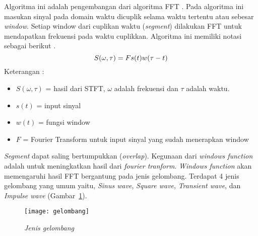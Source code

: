 Algoritma ini adalah pengembangan dari algoritma FFT \cite{yani:0:stft}. Pada algoritma ini masukan sinyal pada domain waktu dicuplik selama waktu tertentu atau sebesar {\it window}. Setiap window dari cuplikan waktu ({\it segment}) dilakukan FFT untuk mendapatkan frekuensi pada waktu cuplikkan. Algoritma ini memiliki notasi sebagai berikut \cite{seo:0:stft}.
	\begin{equation}\label{eqn:STFT}
		S(\omega,\tau)=Fs(t) w(\tau - t) \\
	\end{equation}
	Keterangan : \\
	\begin{itemize}
		\item $S(\omega,\tau)$ = hasil dari STFT, $\omega$ adalah frekuensi dan $\tau$ adalah waktu. \\
		\item $s(t)$ = input sinyal \\
		\item $w(t)$ = fungsi window \\
		\item $F$ = Fourier Transform untuk input sinyal yang sudah menerapkan window
	\end{itemize}

	{\it Segment} dapat saling bertumpukkan ({\it overlap}). Kegunaan dari {\it windows function} adalah untuk meningkatkan hasil dari {\it fourier tranform}\cite{hp:10:hp}. {\it Windows function} akan memengaruhi hasil FFT bergantung pada jenis gelombang. Terdapat 4 jenis gelombang yang umum yaitu, {\it Sinus wave}, {\it Square wave}, {\it Transient wave}, dan {\it Impulse wave} (Gambar~\ref{fig:gelombang}). 
	\begin{figure} [H]
	\centering  
	\texttt{[image: gelombang]}  
	\caption[Jenis gelombang]{{\it Jenis gelombang}} 
	\label{fig:gelombang} 
	\end{figure} 
	
